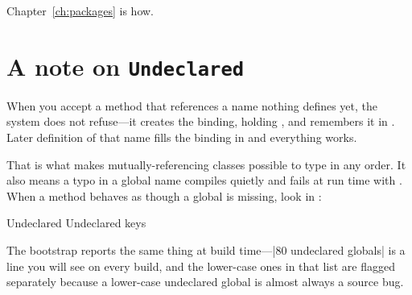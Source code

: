 Chapter~\ref{ch:packages} is how.

\section{A note on \texttt{Undeclared}}

When you accept a method that references a name nothing defines yet, the
system does not refuse---it creates the binding, holding , and
remembers it in . Later definition of that name fills the
binding in and everything works.

That is what makes mutually-referencing classes possible to type in any order.
It also means a typo in a global name compiles quietly and fails at run time
with . When a method behaves as though a global is
missing, look in :

\begin{st}
Undeclared
Undeclared keys
\end{st}

The bootstrap reports the same thing at build time---\ct|80 undeclared globals| is a line you will see on every build, and the lower-case ones in
that list are flagged separately because a lower-case undeclared global is
almost always a source bug.
